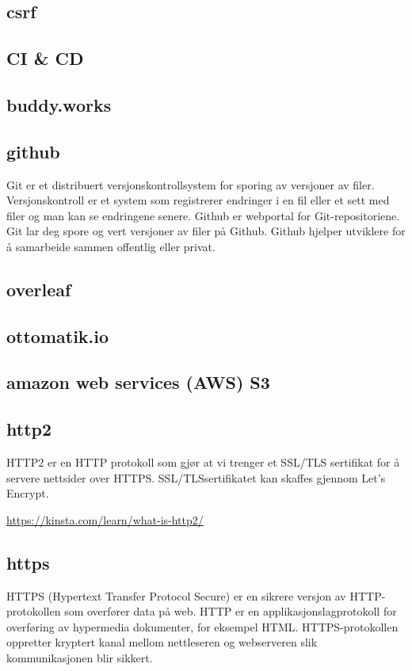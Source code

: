 \subsection{csrf}
\subsection{CI \& CD}
\subsection{buddy.works}
\subsection{github}
 Git er et distribuert versjonskontrollsystem for sporing av versjoner av filer. Versjonskontroll er et system som registrerer endringer i en fil eller et sett med filer og man kan se endringene senere. Github er webportal for Git-repositoriene. Git lar deg spore og vert versjoner av filer på Github. Github hjelper utviklere for å samarbeide sammen offentlig eller privat.
 
\subsection{overleaf}
\subsection{ottomatik.io}

\subsection{amazon web services (AWS) S3}
\subsection{http2}
HTTP2 er en HTTP protokoll som gjør at vi trenger et SSL/TLS sertifikat for å servere nettsider over HTTPS. SSL/TLSsertifikatet kan skaffes gjennom Let’s Encrypt.  

\url{https://kinsta.com/learn/what-is-http2/}

\subsection{https}
HTTPS (Hypertext Transfer Protocol Secure) er en sikrere versjon av HTTP-protokollen som overfører data på web. HTTP er en applikasjonslagprotokoll for overføring av hypermedia dokumenter, for eksempel HTML. HTTPS-protokollen oppretter kryptert kanal mellom nettleseren og webserveren slik  kommunikasjonen blir sikkert. 

